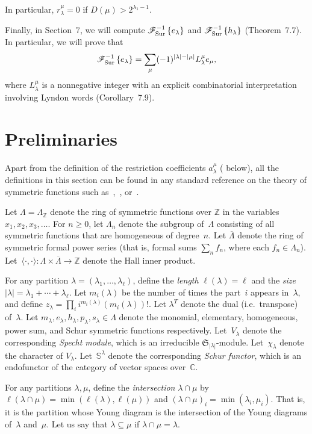 \documentclass[11pt]{article}
\theoremstyle{definition}
\providecommand{\ie}{i.e.\ }
\numberwithin{equation}{section}
\newcommand{\K}{\mathbb{C}}
\newcommand{\Z}{\mathbb{Z}}
\newcommand{\Sur}{\mathchoice{\operatorname{Sur}}{\operatorname{Sur}}{\mathrm{Sur}}{\mathrm{Sur}}}
\newcommand{\FSurInv}[1]{\mathscr{F}_{\Sur}^{-1}\left\{#1\right\}}
\newcommand{\Sym}{\mathfrak{S}}
\begin{document}
In particular, $r_{\lambda}^\mu = 0$ if $D(\mu) > 2^{\lambda_1 - 1}$.

Finally, in Section~7, we will compute $\FSurInv{e_\lambda}$ and $\FSurInv{h_\lambda}$ (Theorem~7.7). In particular, we will prove that \[\FSurInv{e_\lambda} = \sum_{\mu} (-1)^{|\lambda| - |\mu|} L_\lambda^\mu e_\mu,\] where $L_\lambda^\mu$ is a nonnegative integer with an explicit combinatorial interpretation involving Lyndon words (Corollary~7.9).

\section{Preliminaries}\label{section:preliminaries}
Apart from the definition of the restriction coefficients $a_\lambda^\mu$ ( below), all the definitions in this section can be found in any standard reference on the theory of symmetric functions such as~\cite{MR1464693},~\cite[Chapter~I]{MR3443860}, or~\cite[Chapter~7]{MR4621625}.

Let $\Lambda = \Lambda_\mathbb{Z}$ denote the ring of symmetric functions over $\mathbb{Z}$ in the variables $x_1, x_2, x_3, \ldots$. For $n \geq 0$, let $\Lambda_n$ denote the subgroup of~$\Lambda$ consisting of all symmetric functions that are homogeneous of degree~$n$. Let $\overline{\Lambda}$ denote the ring of symmetric formal power series (that is, formal sums $\sum_{n} f_n$, where each $f_n \in \Lambda_n$). Let~$\langle \cdot, \cdot \rangle \colon \Lambda \times \overline{\Lambda} \to \Z$ denote the Hall inner product.

For any partition $\lambda = (\lambda_1, \ldots, \lambda_\ell)$, define the \emph{length} $\ell(\lambda) = \ell$ and the \emph{size} $|\lambda| = \lambda_1 + \cdots + \lambda_\ell$. Let $m_i(\lambda)$ be the number of times the part~$i$ appears in~$\lambda$, and define $z_\lambda = \prod_i i^{m_i(\lambda)} (m_i(\lambda))!$. Let $\lambda^T$ denote the dual (\ie transpose) of~$\lambda$. Let $m_\lambda, e_\lambda, h_\lambda, p_\lambda, s_\lambda \in \Lambda$ denote the monomial, elementary, homogeneous, power sum, and Schur symmetric functions respectively. Let~$V_\lambda$ denote the corresponding \emph{Specht module}, which is an irreducible $\Sym_{|\lambda|}$-module. Let~$\chi_\lambda$ denote the character of $V_\lambda$. Let~$\mathbb{S}^\lambda$ denote the corresponding \emph{Schur functor}, which is an endofunctor of the category of vector spaces over~$\K$.

For any partitions $\lambda, \mu$, define the \emph{intersection} $\lambda \cap \mu$ by $\ell(\lambda \cap \mu) = \min(\ell(\lambda), \ell(\mu))$ and $(\lambda \cap \mu)_i = \min(\lambda_i, \mu_i)$. That is, it is the partition whose Young diagram is the intersection of the Young diagrams of~$\lambda$ and~$\mu$. Let us say that $\lambda \subseteq \mu$ if $\lambda \cap \mu = \lambda$.
\end{document}
